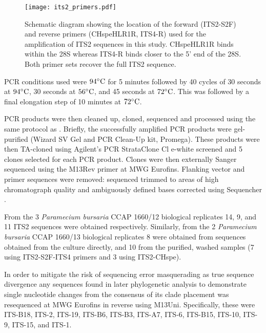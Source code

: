 \begin{figure}
    \texttt{[image: its2\_primers.pdf]}
    \caption[ITS Primer Locations]{Schematic diagram showing the location of the forward (ITS2-S2F) and reverse
    primers (CHspeHLR1R, ITS4-R) used for the amplification of ITS2 sequences in this study.
    CHspeHLR1R binds within the 28S whereas ITS4-R binds closer to the 5' end of the 28S.  Both
primer sets recover the full ITS2 sequence.}
    \label{fig:its2_primers}
\end{figure}

PCR conditions used were \(94\celsius\) for 5 minutes followed by
40 cycles of 30 seconds at \(94\celsius\), 30 seconds at \(56\celsius\),
and 45 seconds at \(72\celsius\). This was followed by a final
elongation step of 10 minutes at \(72\celsius\).

PCR products were then cleaned up, cloned, sequenced
and processed using the same protocol as \citep{Maguire2014a}.
Briefly, the successfully amplified PCR products were gel-purified 
(Wizard SV Gel and PCR Clean-Up kit, Promega).
These products were then TA-cloned 
using Agilent's PCR StrataClone Cl e-white screened and 5 clones
selected for each PCR product.  
Clones were then externally Sanger sequenced using the M13Rev primer
at MWG Eurofins. 
Flanking vector and primer sequences were removed: sequenced trimmed to 
areas of high chromatograph quality and ambiguously defined bases corrected
using Sequencher \citep{Sequencher}.

From the 3 \textit{Paramecium bursaria} CCAP 1660/12 biological replicates
14, 9, and 11 ITS2 sequences were obtained respectively.
Similarly, from the 2 \textit{Paramecium bursaria} CCAP 1660/13 biological replicates
8 were obtained from sequences obtained from the culture directly, and 10
from the purified, washed samples (7 using ITS2-S2F-ITS4 primers and 3 using
ITS2-CHspe). 

In order to mitigate the risk of sequencing error masquerading
as true sequence divergence any sequences found in later phylogenetic
analysis to demonstrate single nucleotide changes from the consensus
of its clade placement was resequenced at MWG Eurofins in reverse 
using M13Uni.  Specifically, these were ITS-B18,
ITS-2, ITS-19, ITS-B6, ITS-B3, ITS-A7, ITS-6, ITS-B15,
ITS-10, ITS-9, ITS-15, and ITS-1.

%


